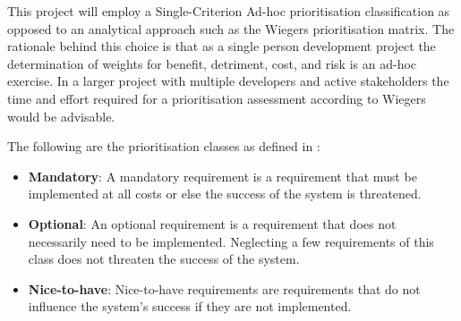This project will employ a Single-Criterion Ad-hoc prioritisation classification as opposed to an analytical approach such as the Wiegers prioritisation matrix. The rationale behind this choice is that as a single person development project the determination of weights for benefit, detriment, cost, and risk is an ad-hoc exercise. In a larger project with multiple developers and active stakeholders the time and effort required for a prioritisation assessment according to Wiegers would be advisable.

The following are the prioritisation classes as defined in \cite{9781937538774}:

\begin{itemize}[label={}]

\item \textbf{Mandatory}: A mandatory requirement is a requirement that must be implemented at all costs or else the success of the system is threatened.
\item \textbf{Optional}: An optional requirement is a requirement that does not necessarily need to be implemented. Neglecting a few requirements of this class does not threaten the success of the system.
\item \textbf{Nice-to-have}: Nice-to-have requirements are requirements that do not influence the system’s success if they are not implemented.

\end{itemize}

